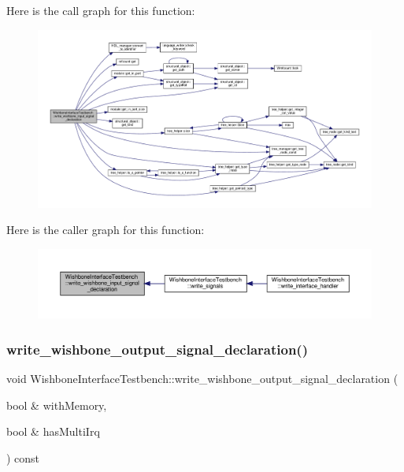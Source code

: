 Here is the call graph for this function\+:
\nopagebreak
\begin{figure}[H]
\begin{center}
\leavevmode
\includegraphics[width=350pt]{de/ded/classWishboneInterfaceTestbench_adc1417a0e4510edbb2235bad38f5741d_cgraph}
\end{center}
\end{figure}
Here is the caller graph for this function\+:
\nopagebreak
\begin{figure}[H]
\begin{center}
\leavevmode
\includegraphics[width=350pt]{de/ded/classWishboneInterfaceTestbench_adc1417a0e4510edbb2235bad38f5741d_icgraph}
\end{center}
\end{figure}
\mbox{\label{classWishboneInterfaceTestbench_ab0f2a4e30aad0f4854e902054d1a6114}} 
\subsubsection{\texorpdfstring{write\+\_\+wishbone\+\_\+output\+\_\+signal\+\_\+declaration()}{write\_wishbone\_output\_signal\_declaration()}}
{\footnotesize\ttfamily void Wishbone\+Interface\+Testbench\+::write\+\_\+wishbone\+\_\+output\+\_\+signal\+\_\+declaration (\begin{DoxyParamCaption}\item[{bool \&}]{with\+Memory,  }\item[{bool \&}]{has\+Multi\+Irq }\end{DoxyParamCaption}) const\hspace{0.3cm}{\ttfamily [protected]}}


